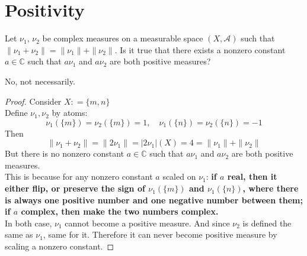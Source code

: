 \documentclass[lang=cn,11pt]{elegantbook}
\begin{document}
 \section{Positivity}
  Let $\nu_1$, $\nu_2$ be complex measures on a measurable space $(X,\mathcal{A})$ such that $\|\nu_1+\nu_2\|=\|\nu_1\|+\|\nu_2\|$. Is it true that there exists a nonzero constant $a\in\mathbb{C}$ such that $a\nu_1$ and $a\nu_2$ are both positive measures? 
\begin{solution}
    No, not necessarily.
\end{solution}
\begin{proof}
Consider $X : = \{ m,n \}$\\
Define $\nu_1, \nu_2$ by atoms: \[
\nu_1 ( \{ m\})= \nu_2 ( \{ m\}) = 1,\quad \nu_1 ( \{ n\}) =\nu_2  ( \{ n\}) = -1
\]   Then \[
\| \nu_1 + \nu_2\| = \| 2\nu_1 \|  = |2\nu_1| (X)   = 4 = \| \nu_1 \| + \| \nu_2\|
\]
But there is no nonzero constant $a\in\mathbb{C}$ such that $a\nu_1$ and $a\nu_2$ are both positive measures. \\
This is because for any nonzero constant $a$ scaled on $\nu_1$: \textbf{if $a$ real, then it either flip, or preserve the sign of  $\nu_1( \{ m\})$ and $\nu_1 ( \{ n\})$}\textbf{, where there is always one positive number and one negative number between them; if $a$ complex, then make the two numbers complex.}\\
In both case, $\nu_1$ cannot become a positive measure. And since $\nu_2$ is defined the same as $\nu_1$, same for it.
Therefore it can never become positive measure by scaling a nonzero constant.
\end{proof}




 
\end{document}
